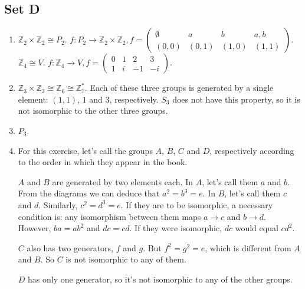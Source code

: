 \subsection{Set D}
\begin{enumerate}
    \item $ \mathbb{Z}_2 \times \mathbb{Z}_2 \cong P_2 $. $ f: P_2 \rightarrow \mathbb{Z}_2 \times \mathbb{Z}_2, f = 
    \begin{pmatrix}
        \emptyset & {a}    & {b}    & {a, b}\\
        (0, 0)    & (0, 1) & (1, 0) & (1, 1)
    \end{pmatrix} $.\\
    $ \mathbb{Z}_4 \cong V $. $ f: \mathbb{Z}_4 \rightarrow V, f = 
    \begin{pmatrix}
        0 & 1 &  2 & 3 \\
        1 & i & -1 & -i
    \end{pmatrix}$.
    
    \item $ \mathbb{Z}_3 \times \mathbb{Z}_2 \cong \mathbb{Z}_6 \cong \mathbb{Z}_7^* $. Each of these three groups is generated by a single element: $ (1, 1) $, $ 1 $ and $ 3 $, respectively. $ S_3 $ does not have this property, so it is not isomorphic to the other three groups.
    
    \item $ P_3 $.
    
    \item For this exercise, let's call the groups $ A $, $ B $, $ C $ and $ D $, respectively according to the order in which they appear in the book.

    $ A $ and $ B $ are generated by two elements each. In $ A $, let's call them $ a $ and $ b $. From the diagrams we can deduce that $ a^2 = b^3 = e $. In $ B $, let's call them $ c $ and $ d $. Similarly, $ c^2 = d^3 = e $. If they are to be isomorphic, a necessary condition is: any isomorphism between them maps $ a \to c $ and $ b \to d $. However, $ ba = ab^2 $ and $ dc = cd $. If they were isomorphic, $ dc $ would equal $ cd^2 $.

    $ C $ also has two generators, $ f $ and $ g $. But $ f^2 = g^2 = e $, which is different from $ A $ and $ B $. So $ C $ is not isomorphic to any of them.

    $ D $ has only one generator, so it's not isomorphic to any of the other groups.
\end{enumerate}

